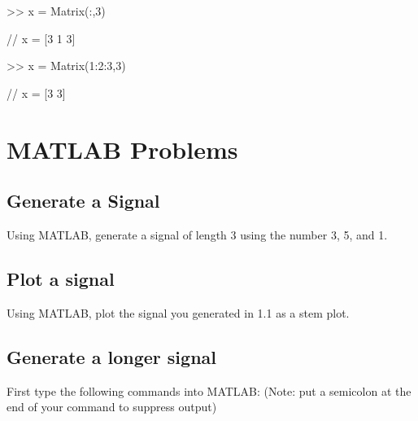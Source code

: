 \documentclass[11pt]{article}
\begin{document}
\vspace{4mm}

\begin{center}

>> x = Matrix(:,3)



\end{center}

\begin{center}


// x  =  [3 1 3]

\end{center}

\vspace{4mm}

\begin{center}

>> x = Matrix(1:2:3,3)



\end{center}

\begin{center}


// x  =  [3 3]

\end{center}








\section{MATLAB Problems}
\subsection{Generate a Signal}

Using MATLAB, generate a signal of length 3 using the number 3, 5, and 1.

\subsection{Plot a signal}
Using MATLAB, plot the signal you generated in 1.1 as a stem plot.

\subsection{Generate a longer signal}
First type the following commands into MATLAB:\newline
(Note: put a semicolon at the end of your command to suppress output)
\end{document}
